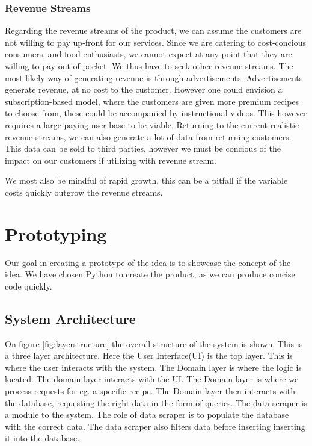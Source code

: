 \documentclass{article}
\begin{document}
\subsubsection{Revenue Streams}
Regarding the revenue streams of the product, we can assume the customers are not willing
to pay up-front for our services. Since we are catering to cost-concious consumers, and
food-enthusiasts, we cannot expect at any point that they are willing to pay out of
pocket. We thus have to seek other revenue streams. The most likely way of generating
revenue is through advertisements. Advertisements generate revenue, at no cost to the
customer. 
However one could envision a subscription-based model, where the customers are given more
premium recipes to choose from, these could be accompanied by instructional videos. This
however requires a large paying user-base to be viable.
Returning to the current realistic revenue streams, we can also generate a lot of data
from returning customers. This data can be sold to third parties, however we must be
concious of the impact on our customers if utilizing with revenue stream.

We most also be mindful of rapid growth, this can be a pitfall if the variable costs
quickly outgrow the revenue streams.


\section{Prototyping}
Our goal in creating a prototype of the idea is to showcase the concept of the idea. We
have chosen Python to create the product, as we can produce concise code quickly. 

\subsection{System Architecture}

On figure \ref{fig:layerstructure} the overall structure of the system is shown. This is a
three layer architecture. Here the User Interface(UI) is the top layer. This is where the
user interacts with the system. The Domain layer is where the logic is located. The domain
layer interacts with the UI. The Domain layer is where we process requests for eg. a
specific recipe. The Domain layer then interacts with the database, requesting the right
data in the form of queries. The data scraper is a module to the system. The role of data
scraper is to populate the database with the correct data. The data scraper also filters
data before inserting inserting it into the database.
\end{document}

